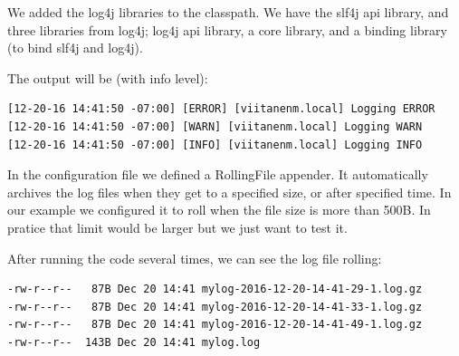We added the log4j libraries to the classpath. We have the slf4j api library, and three libraries from log4j; log4j api library, a core library, and a binding library (to bind slf4j and log4j). 

The output will be (with info level):
\begin{lstlisting}
[12-20-16 14:41:50 -07:00] [ERROR] [viitanenm.local] Logging ERROR
[12-20-16 14:41:50 -07:00] [WARN] [viitanenm.local] Logging WARN
[12-20-16 14:41:50 -07:00] [INFO] [viitanenm.local] Logging INFO
\end{lstlisting}

In the configuration file we defined a RollingFile appender. It automatically archives the log files when they get to a specified size, or after specified time. In our example we configured it to roll when the file size is more than 500B. In pratice that limit would be larger but we just want to test it.

After running the code several times, we can see the log file rolling:
\begin{lstlisting}
-rw-r--r--   87B Dec 20 14:41 mylog-2016-12-20-14-41-29-1.log.gz
-rw-r--r--   87B Dec 20 14:41 mylog-2016-12-20-14-41-33-1.log.gz
-rw-r--r--   87B Dec 20 14:41 mylog-2016-12-20-14-41-49-1.log.gz
-rw-r--r--  143B Dec 20 14:41 mylog.log
\end{lstlisting}
